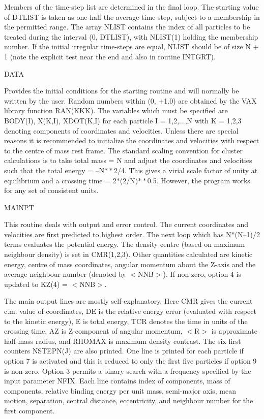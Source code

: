  Members of the time-step list are determined in the final loop.  The starting
 value of DTLIST is taken as one-half the average time-step, subject to a
 membership in the permitted range.  The array
 NLIST contains the index of all particles to be treated during the interval
 (0, DTLIST), with NLIST(1) holding the membership number.  If the initial
 irregular time-steps are equal, NLIST should be of size N + 1 (note
 the explicit test near the end and also in routine INTGRT).
\bigskip
\bigskip
\centerline {DATA}
\bigskip

 Provides the initial conditions for the starting routine and will normally
 be written by the user.  Random numbers within (0, +1.0) are obtained by the
  VAX library function RAN(KKK).  The
 variables which must be specified are BODY(I),
 X(K,I), XDOT(K,I) for each particle I = 1,2,...,N with K = 1,2,3 denoting
 components of coordinates and velocities.  Unless there are special reasons
 it is recommended to initialize the coordinates and velocities with respect
 to the centre of mass rest frame.  The standard scaling convention for cluster
 calculations is to take total mass = N and adjust the coordinates and
 velocities such that the total energy = --N$\ast\ast$2/4.  This gives a virial
 scale
 factor of unity at equilibrium and a crossing time = 2$\ast$(2/N)$\ast\ast$0.5.
  However,
 the program works for any set of consistent units.
\bigskip
\bigskip
\centerline {MAINPT}
\bigskip

  This routine deals with output and error control.  The current
 coordinates and velocities are first predicted to highest order.  The next loop
 which has N$\ast$(N--1)/2 terms evaluates the potential energy.  The density
 centre (based on maximum neighbour density) is set in CMR(1,2,3).
 Other quantities calculated are kinetic energy,
                centre of mass coordinates, angular momentum about the Z-axis
 and the average neighbour number (denoted by $<$NNB$>$).  If non-zero,
 option 4 is updated to KZ(4) = $<$NNB$>$.

   The main output lines are mostly self-explanatory.  Here CMR
 gives the current c.m. value of coordinates, DE is the relative
 energy error (evaluated with respect to the kinetic energy), E
 is total energy, TCR denotes the time in units of the crossing
 time, AZ is Z-component of angular momentum, $<$R$>$ is
 approximate half-mass radius, and RHOMAX is maximum density
 contrast. The six first counters NSTEPN(J) are also printed.
 One line is printed for each particle if
 option 7 is activated and this is reduced to only the first five particles if
      option 9 is non-zero.  Option 3 permits a binary search with a frequency
 specified by the input parameter NFIX.  Each line contains index of components,
 mass of components, relative binding energy per unit mass, semi-major axis,
 mean motion, separation, central distance, eccentricity, and neighbour
 number for the first component.

